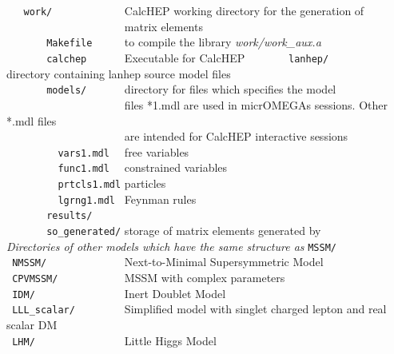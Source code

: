 \documentclass[12pt,a4paper]{article}
\begin{document}
\verb|   work/            |              CalcHEP working directory for the generation of   \\
\verb|                    |             matrix elements                                    \\
\verb|       Makefile     |  to compile the library {\it work/work\_aux.a}           \\ 
\verb|       calchep      | Executable for CalcHEP
\verb|       lanhep/      |          directory containing lanhep source model files   \\
\verb|       models/      |  directory for files  which specifies the model\\
\verb|                    | files *1.mdl are used in micrOMEGAs sessions. Other *.mdl files\\
\verb|                    | are intended for CalcHEP interactive sessions\\
\verb|         vars1.mdl  |  free  variables   \\
\verb|         func1.mdl  |  constrained variables   \\
\verb|         prtcls1.mdl|  particles  \\
\verb|         lgrng1.mdl |  Feynman rules\\
\verb|       results/  |                                                  \\
\verb|       so_generated/|   storage  of  matrix elements generated by \calchep \\
{\it Directories of other models which have the same structure as} {\tt  MSSM/ }\\
\verb| NMSSM/             |         Next-to-Minimal Supersymmetric Model\cite{Ellwanger:2006rn,Belanger:2005kh} \\
\verb| CPVMSSM/           |         MSSM with complex parameters\cite{Lee:2003nta,  Belanger:2006qa} \\
\verb| IDM/               |         Inert Doublet Model\cite{Barbieri:2006dq}  \\
\verb| LLL_scalar/        | Simplified model with singlet charged lepton and real scalar DM \\ 
\verb| LHM/               |         Little Higgs Model\cite{Belyaev:2006jh} \\
\end{document}
